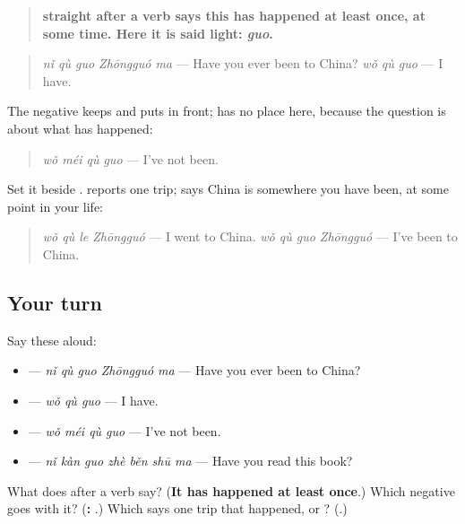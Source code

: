 \begin{grammarlens}[title={Grammar Lens: \zh{了} says it happened; \zh{过} says it has happened at least once}]
\begin{quote}
\textbf{ straight after a verb says this has happened at least once, at some time. Here it is said light: \emph{guo}.}
\end{quote}

\begin{quote}
\textbf{} \emph{nǐ qù guo Zhōngguó ma} — Have you ever been to China? \textbf{} \emph{wǒ qù guo} — I have.
\end{quote}

The negative keeps  and puts  in front;  has no place here, because the question is about what has happened:

\begin{quote}
\textbf{} \emph{wǒ méi qù guo} — I've not been.
\end{quote}

Set it beside .  reports one trip;  says China is somewhere you have been, at some point in your life:

\begin{quote}
\textbf{} \emph{wǒ qù le Zhōngguó} — I went to China. \textbf{} \emph{wǒ qù guo Zhōngguó} — I've been to China.
\end{quote}
\end{grammarlens}

\subsection*{Your turn}
Say these aloud:

\begin{itemize}
\raggedright
  \item {} — \emph{nǐ qù guo Zhōngguó ma} — Have you ever been to China?
  \item {} — \emph{wǒ qù guo} — I have.
  \item {} — \emph{wǒ méi qù guo} — I've not been.
  \item {} — \emph{nǐ kàn guo zhè běn shū ma} — Have you read this book?
\end{itemize}

\begin{tcolorbox}[breakable,colback=teal!4,colframe=teal!35!black,title={Before you move on}]
What does  after a verb say? (\textbf{It has happened at least once}.) Which negative goes with it? (\textbf{: }.) Which says one trip that happened,  or ? (\textbf{}.)
\end{tcolorbox}
